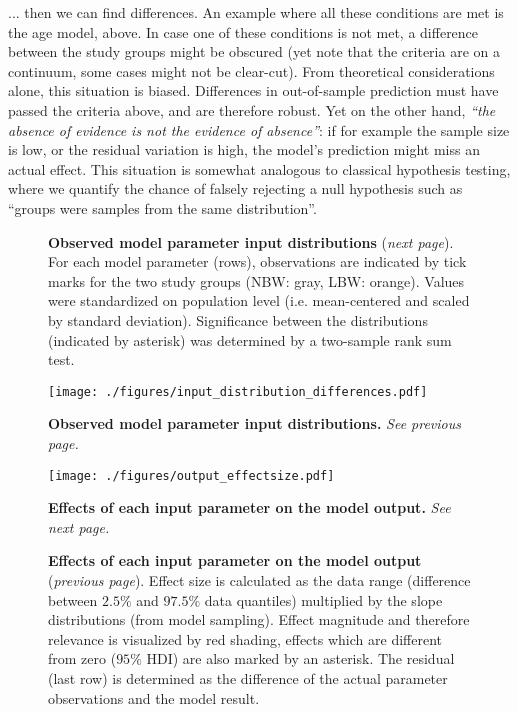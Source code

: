 \begin{change}
... then we can find differences.
An example where all these conditions are met is the age model, above.
In case one of these conditions is not met, a difference between the study groups might be obscured (yet note that the criteria are on a continuum, some cases might not be clear-cut).
From theoretical considerations alone, this situation is biased.
Differences in out-of-sample prediction must have passed the criteria above, and are therefore robust.
Yet on the other hand, \textit{``the absence of evidence is not the evidence of absence''}: if for example the sample size is low, or the residual variation is high, the model's prediction might miss an actual effect.
This situation is somewhat analogous to classical hypothesis testing, where we quantify the chance of falsely rejecting a null hypothesis such as ``groups were samples from the same distribution''.

\begin{figure}[b]
  \caption{ \textbf{Observed model parameter input distributions} (\textit{next page}).
For each model parameter (rows), observations are indicated by tick marks for the two study groups (NBW: gray, LBW: orange). Values were standardized on population level (i.e. mean-centered and scaled by standard deviation). Significance between the distributions (indicated by asterisk) was determined by a two-sample rank sum test. }
\end{figure}

\addtocounter{figure}{-1}
\begin{figure}[p!]
\centering
\texttt{[image: ./figures/input\_distribution\_differences.pdf]}
\caption{\label{fig:input_distributions}\textbf{Observed model parameter input distributions.} \textit{See previous page.}}
\end{figure}



\begin{figure}[p!]
\centering
\texttt{[image: ./figures/output\_effectsize.pdf]}
\caption{\label{fig:output_effects}\textbf{Effects of each input parameter on the model output.} \textit{See next page.} }
\end{figure}
\addtocounter{figure}{-1}
\begin{figure}[t]
  \caption{ \textbf{Effects of each input parameter on the model output} (\textit{previous page}).
Effect size is calculated as the data range (difference between \(2.5\%\) and \(97.5\%\) data quantiles) multiplied by the slope distributions (from model sampling). Effect magnitude and therefore relevance is visualized by red shading, effects which are different from zero (\(95\%\) HDI) are also marked by an asterisk. The residual (last row) is determined as the difference of the actual parameter observations and the model result. }
\end{figure}




\end{change}
